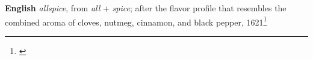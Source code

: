 \begin{etymology}\label{ety:allspice}
\textbf{English} \textit{allspice}, from \textit{all} + \textit{spice}; after the flavor profile that resembles the combined aroma of cloves, nutmeg, cinnamon, and black pepper, 1621\footnote{\textcite[s.v. allspice]{oed}}
\end{etymology}